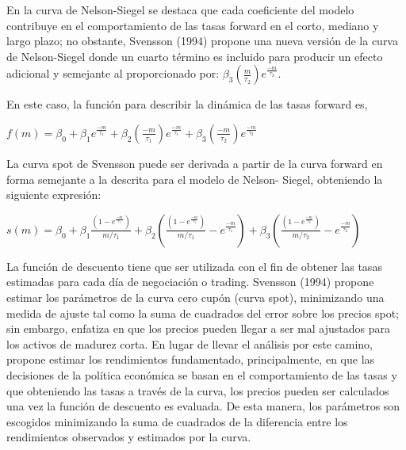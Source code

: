 \hspace*{0.4 cm} En la curva de Nelson-Siegel se destaca que cada coeficiente del modelo
contribuye en el comportamiento de las tasas forward en el corto,
mediano y largo plazo; no obstante, Svensson (1994) propone una nueva
versi\'on de la curva de Nelson-Siegel donde un cuarto t\'ermino es incluido
para producir un efecto adicional y semejante al proporcionado por:
$\beta_{3}(\frac{m}{\tau_{2}})e^{\frac{-m}{\tau_{2}}}$.

\hspace*{0.4 cm} En este caso, la funci\'on para describir la din\'amica de las tasas forward es,

\vspace*{0.2 cm}

\begin{center}
$\displaystyle{f(m) = \beta_{0} + \beta_{1} e^{\frac{-m}{\tau_{1}}} +\beta_{2} \left(\frac{-m}{\tau_{1}}\right)e^{\frac{-m}{\tau_{1}}} + \beta_{3}\left(\frac{-m}{\tau_{2}}\right)e^{\frac{-m}{\tau_{2}}} }$
\end{center}

\vspace*{0.2 cm}

\hspace*{0.4 cm} La curva spot de Svensson puede ser derivada a partir de la curva
forward en forma semejante a la descrita para el modelo de Nelson-
Siegel, obteniendo la siguiente expresi\'on:

\vspace*{0.2 cm}

\begin{center}
$\displaystyle{s(m) = \beta_{0}+ \beta_{1}\frac{\left(1-e^\frac{-m}{\tau_{1}}\right)}{m/\tau_{1}} + \beta_{2} \left(\frac{\left(1-e^\frac{-m}{\tau_{1}}\right)}{m/\tau_{1}} -  e^\frac{-m}{\tau_{1}}\right) + \beta_{3} \left(\frac{\left(1-e^\frac{-m}{\tau_{2}}\right)}{m/\tau_{2}} -  e^\frac{-m}{\tau_{2}}\right)}$
\end{center}

\vspace*{0.2 cm}

\hspace*{0.4 cm} La funci\'on de descuento tiene que ser utilizada con el fin de obtener las
tasas estimadas para cada d\'ia de negociaci\'on o trading. Svensson (1994)
propone estimar los par\'ametros de la curva cero cup\'on (curva spot),
minimizando una medida de ajuste tal como la suma de cuadrados del
error sobre los precios spot; sin embargo, enfatiza en que los precios
pueden llegar a ser mal ajustados para los activos de madurez corta. En
lugar de llevar el an\'alisis por este camino, propone estimar los
rendimientos fundamentado, principalmente, en que las decisiones de la
pol\'itica econ\'omica se basan en el comportamiento de las tasas y que
obteniendo las tasas a trav\'es de la curva, los precios pueden ser
calculados una vez la funci\'on de descuento es evaluada. De esta manera,
los par\'ametros son escogidos minimizando la suma de cuadrados de la
diferencia entre los rendimientos observados y estimados por la curva.

